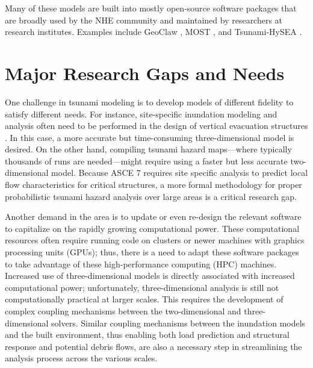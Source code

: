 Many of these models are built into mostly open-source software packages that are broadly used by the NHE community and maintained by researchers at research institutes. Examples include GeoClaw \citep{berger2011geoclaw}, MOST \citep{titov1997implementation}, and Tsunami-HySEA \citep{macias2016comparison}.

\section{Major Research Gaps and Needs}
\label{sec:tsunami_gaps}

One challenge in tsunami modeling is to develop models of different fidelity to satisfy different needs. For instance, site-specific inundation modeling and analysis often need to be performed in the design of vertical evacuation structures \citep{ash2015structures, gonzalez2013tsunami}. In this case, a more accurate but time-consuming three-dimensional model is desired. On the other hand, compiling tsunami hazard maps---where typically thousands of runs are needed---might require using a faster but less accurate two-dimensional model.  Because ASCE 7 requires site specific analysis to predict local flow characteristics for critical structures, a more formal methodology for proper probabilistic tsunami hazard analysis over large areas is a critical research gap.

Another demand in the area is to update or even re-design the relevant software to capitalize on the rapidly growing computational power. These computational resources often require running code on clusters or newer machines with graphics processing units (GPUs); thus, there is a need to adapt these software packages to take advantage of these high-performance computing (HPC) machines.  Increased use of three-dimensional models is directly associated with increased computational power; unfortunately, three-dimensional analysis is still not computationally practical at larger scales.  This requires the development of complex coupling mechanisms between the two-dimensional and three-dimensional solvers.  Similar coupling mechanisms between the inundation models and the built environment, thus enabling both load prediction and structural response and potential debris flows, are also a necessary step in streamlining the analysis process across the various scales.  

%
